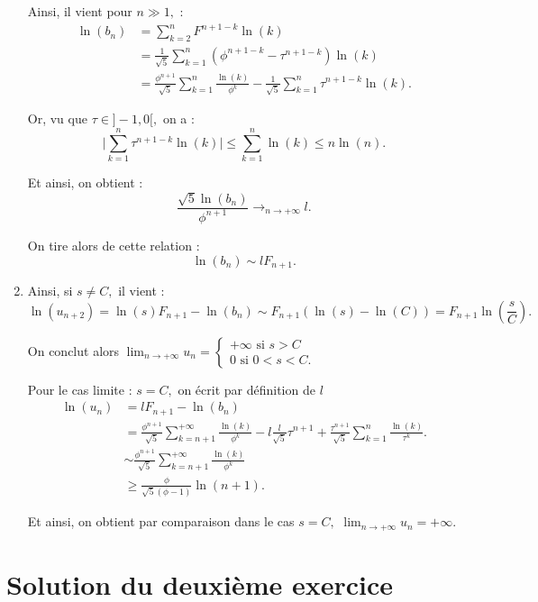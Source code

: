 \begin{enumerate}
Ainsi, il vient pour $n\gg 1,$ : 
\begin{align*}
\ln(b_{n}) & = \sum_{k=2}^{n}F^{n+1-k}\ln(k)\\
& =\frac{1}{\sqrt{5}}\sum_{k=1}^{n}\left(\phi^{n+1-k}-\tau^{n+1-k}\right)\ln(k)\\
& =\frac{\phi^{n+1}}{\sqrt{5}}\sum_{k=1}^{n}\frac{\ln(k)}{\phi^{k}}-\frac{1}{\sqrt{5}}\sum_{k=1}^{n}\tau^{n+1-k}\ln(k).
\end{align*}

Or, vu que $\tau\in]-1,0[,$ on a : $$\vert \sum_{k=1}^{n}\tau^{n+1-k}\ln(k) \vert \leq \sum_{k=1}^{n}\ln(k) \leq n\ln(n).$$

Et ainsi, on obtient  : $$\frac{\sqrt{5}\ln(b_{n})}{\phi^{n+1}}\longrightarrow_{n\rightarrow +\infty} l.$$

On tire alors de cette relation : $$\ln(b_{n})\sim l F_{n+1}.$$

\item Ainsi, si $s \neq C,$ il vient : 
$$\ln(u_{n+2})=\ln(s)F_{n+1}-\ln(b_{n})\sim F_{n+1}\left(\ln(s)-\ln(C)\right)=F_{n+1}\ln(\frac{s}{C}).$$

On conclut alors $\displaystyle \lim_{n\rightarrow +\infty} u_{n}= \left\{ \begin{array}{l}
+\infty \mbox{ si } s>C\\
0 \mbox{ si } 0<s<C.
\end{array}\right.$

Pour le cas limite : $s=C,$ on écrit par définition de $l$
\begin{align*}
\ln(u_{n}) & =lF_{n+1}-\ln(b_{n})\\
& = \frac{\phi^{n+1}}{\sqrt{5}}\sum_{k=n+1}^{+\infty}\frac{\ln(k)}{\phi^{k}}-l\frac{l}{\sqrt{5}}\tau^{n+1}+\frac{\tau^{n+1}}{\sqrt{5}}\sum_{k=1}^{n}\frac{\ln(k)}{\tau^{k}}.\\
& \sim \frac{\phi^{n+1}}{\sqrt{5}}\sum_{k=n+1}^{+\infty}\frac{\ln(k)}{\phi^{k}}\\
& \geq \frac{\phi}{\sqrt{5}(\phi-1)}\ln(n+1).
\end{align*}

Et ainsi, on obtient par comparaison dans le cas $s=C,$ $\displaystyle \lim_{n\rightarrow +\infty}u_{n}=+\infty.$

\end{enumerate}

\section{Solution du deuxième exercice}

